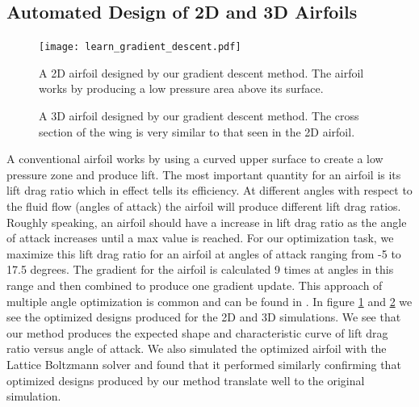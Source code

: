 \documentclass{article} %
\begin{document}
\subsection{Automated Design of 2D and 3D Airfoils}

\begin{figure}[h]
\begin{center}
\texttt{[image: learn\_gradient\_descent.pdf]}
\end{center}
\caption{A 2D airfoil designed by our gradient descent method. The airfoil works by producing a low pressure area above its surface.}
\label{learn_gradient_descent}
\end{figure}

\begin{figure}[h]
\begin{center}
\end{center}
\caption{A 3D airfoil designed by our gradient descent method. The cross section of the wing is very similar to that seen in the 2D airfoil.}
\label{learn_gradient_descent_3d}
\end{figure}

A conventional airfoil works by using a curved upper surface to create a low pressure zone and produce lift. The most important quantity for an airfoil is its lift drag ratio which in effect tells its efficiency. At different angles with respect to the fluid flow (angles of attack) the airfoil will produce different lift drag ratios. Roughly speaking, an airfoil should have a increase in lift drag ratio as the angle of attack increases until a max value is reached. For our optimization task, we maximize this lift drag ratio for an airfoil at angles of attack ranging from -5 to 17.5 degrees. The gradient for the airfoil is calculated 9 times at angles in this range and then combined to produce one gradient update. This approach of multiple angle optimization is common and can be found in \citet{drela1998pros}. In figure \ref{learn_gradient_descent} and \ref{learn_gradient_descent_3d} we see the optimized designs produced for the 2D and 3D simulations. We see that our method produces the expected shape and characteristic curve of lift drag ratio versus angle of attack. We also simulated the optimized airfoil with the Lattice Boltzmann solver and found that it performed similarly confirming that optimized designs produced by our method translate well to the original simulation.
\end{document}
